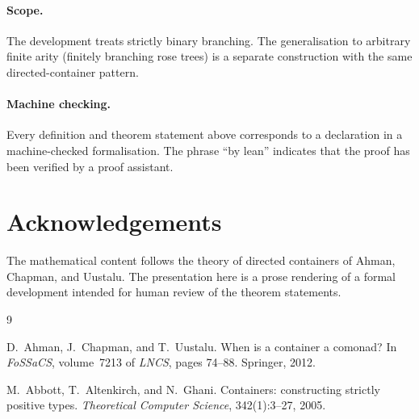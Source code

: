 \documentclass[11pt,a4paper]{article}
\theoremstyle{plain}
\theoremstyle{definition}
\begin{document}
\paragraph{Scope.}
The development treats strictly binary branching. The generalisation to
arbitrary finite arity (finitely branching rose trees) is a separate
construction with the same directed-container pattern.

\paragraph{Machine checking.}
Every definition and theorem statement above corresponds to a declaration
in a machine-checked formalisation. The phrase ``by lean'' indicates that
the proof has been verified by a proof assistant.

\section*{Acknowledgements}

The mathematical content follows the theory of directed containers of
Ahman, Chapman, and Uustalu. The presentation here is a prose rendering
of a formal development intended for human review of the theorem
statements.

\begin{thebibliography}{9}

D.~Ahman, J.~Chapman, and T.~Uustalu.
\newblock When is a container a comonad?
\newblock In \emph{FoSSaCS}, volume~7213 of \emph{LNCS}, pages 74--88.
\newblock Springer, 2012.

M.~Abbott, T.~Altenkirch, and N.~Ghani.
\newblock Containers: constructing strictly positive types.
\newblock \emph{Theoretical Computer Science}, 342(1):3--27, 2005.

\end{thebibliography}
\end{document}
